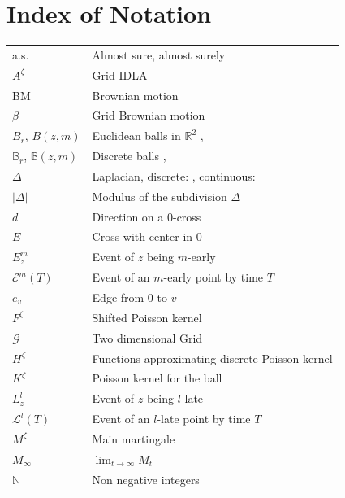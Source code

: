 \documentclass[11pt]{article}
\numberwithin{equation}{section}
\begin{document}
\section*{Index of Notation}

\begin{tabular}{L{4cm} L{9cm}} 
  a.s.    & Almost sure, almost surely \\
  $A^{\zeta}$ & Grid IDLA \pageref{D: AZT} \\
  BM & Brownian motion \\
  $\beta$ & Grid Brownian motion \pageref{eq: def of grid BM}\\
  $B_r$, $B(z,m)$ & Euclidean balls in $\mathbb{R}^2$ \pageref{D: B_r}, \pageref{D: B(z,r)}\\
  $\mathbb{B}_r$, $\mathbb{B}(z, m)$ & Discrete balls \pageref{D: mathbb(B)_r}, \pageref{D: mathbbB(z,r)}\\
  $\Delta$ & Laplacian, discrete: \pageref{D: discrete Lapacian}, continuous: \pageref{D: cont laplacian} \\
  $|\Delta|$ & Modulus of the subdivision $\Delta$ \\
  $d$  & Direction on a $0$-cross \pageref{D: direction d} \\
  $E$ & Cross with center in $0$ \pageref{D: E}\\
  $E_z^m$ & Event of $z$ being $m$-early \pageref{D: z is m early}\\
  $\mathcal{E}^m(T)$ & Event of an $m$-early point by time $T$ \pageref{D: def E_m(T)} \\
  $e_v$ & Edge from $0$ to $v$ \pageref{D: edge e_v}\\
  $F^{\zeta}$ & Shifted Poisson kernel \pageref{D: def F^zeta}\\
  $\mathcal{G}$ & Two dimensional Grid \pageref{D: grid}\\
  $H^{\zeta}$ & Functions approximating discrete Poisson kernel \pageref{D: H zeta}\\
  $K^{\zeta}$ & Poisson kernel for the ball \pageref{D: poisson kernel K}\\
  $L_z^l$ & Event of $z$ being $l$-late \pageref{D: z is l late}\\
  $\mathcal{L}^l(T)$ & Event of an $l$-late point by time $T$ \pageref{D: L_l(T)}\\
  $M^{\zeta}$ & Main martingale \pageref{D: MZT}\\
  $M_{\infty}$ &  $\lim_{t \rightarrow \infty} M_t$\\
  $\mathbb{N}$ & Non negative integers\\

\end{tabular}
\end{document}

